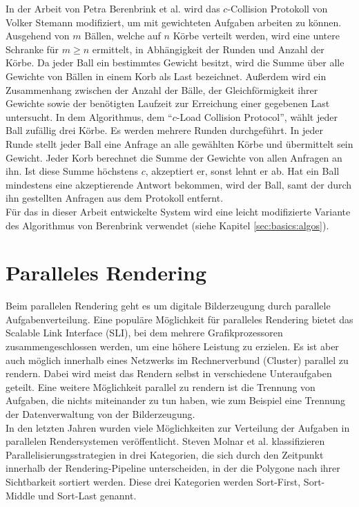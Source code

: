 In der Arbeit von Petra Berenbrink et al. \cite{ccol2} wird das $c$-Collision Protokoll von Volker Stemann \cite{ccol3} modifiziert, um mit gewichteten Aufgaben arbeiten zu können. Ausgehend von $m$ Bällen, welche auf $n$ Körbe verteilt werden, wird eine untere Schranke für $m \ge n$ ermittelt, in Abhängigkeit der Runden und Anzahl der Körbe. Da jeder Ball ein bestimmtes Gewicht besitzt, wird die Summe über alle Gewichte von Bällen in einem Korb als Last bezeichnet. Außerdem wird ein Zusammenhang zwischen der Anzahl der Bälle, der Gleichförmigkeit ihrer Gewichte sowie der benötigten Laufzeit zur Erreichung einer gegebenen Last untersucht. In dem Algorithmus, dem "`$c$-Load Collision Protocol"', wählt jeder Ball zufällig drei Körbe. Es werden mehrere Runden durchgeführt. In jeder Runde stellt jeder Ball eine Anfrage an alle gewählten Körbe und übermittelt sein Gewicht. Jeder Korb berechnet die Summe der Gewichte von allen Anfragen an ihn. Ist diese Summe höchstens $c$, akzeptiert er, sonst lehnt er ab. Hat ein Ball mindestens eine akzeptierende Antwort bekommen, wird der Ball, samt der durch ihn gestellten Anfragen aus dem Protokoll entfernt.\\
Für das in dieser Arbeit entwickelte System wird eine leicht modifizierte Variante des Algorithmus von Berenbrink verwendet (siehe Kapitel \ref{sec:basics:algos}).
\section{Paralleles Rendering}
\label{sec:relwork:parrender}
Beim parallelen Rendering geht es um digitale Bilderzeugung durch parallele Aufgabenverteilung. Eine populäre Möglichkeit für paralleles Rendering bietet das Scalable Link Interface (SLI), bei dem mehrere Grafikprozessoren zusammengeschlossen werden, um eine höhere Leistung zu erzielen. Es ist aber auch möglich innerhalb eines Netzwerks im Rechnerverbund (Cluster) parallel zu rendern. Dabei wird meist das Rendern selbst in verschiedene Unteraufgaben geteilt. Eine weitere Möglichkeit parallel zu rendern ist die Trennung von Aufgaben, die nichts miteinander zu tun haben, wie zum Beispiel eine Trennung der Datenverwaltung von der Bilderzeugung.\\
In den letzten Jahren wurden viele Möglichkeiten zur Verteilung der Aufgaben in parallelen Rendersystemen veröffentlicht. Steven Molnar et al. \cite{molnar} klassifizieren Parallelisierungsstrategien in drei Kategorien, die sich durch den Zeitpunkt innerhalb der Rendering-Pipeline unterscheiden, in der die Polygone nach ihrer Sichtbarkeit sortiert werden. Diese drei Kategorien werden Sort-First, Sort-Middle und Sort-Last genannt.

